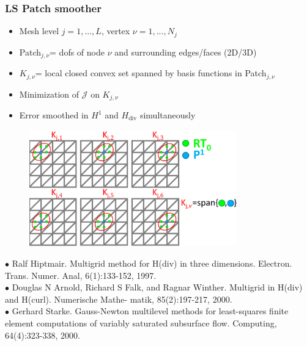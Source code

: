 \documentclass[8pt, oneside]{beamer}   	%
\newcommand{\colo}{\color{orange}}
\newcommand{\titlecolor}[1]{\frametitle{\textcolor{dkgrey}{ \textbf{#1}}}}
\begin{document}

\begin{frame}
\titlecolor{LS Patch smoother}
\begin{itemize}
\item Mesh level $j=1,...,L$, vertex $\nu=1,...,N_j$ 
\item Patch$_{j,\nu}$= dofs of node $\nu$ and surrounding edges/faces (2D/3D)
\item {\colo $K_{j,\nu}$= local closed convex set} spanned by basis functions in Patch$_{j,\nu}$
\item Minimization of $\mathcal{J}$ on $K_{j,\nu}$ 
\item  Error smoothed in $H^1$ and $H_{\text{div}}$ simultaneously
\end{itemize}
\begin{figure}[htbp!]
	\includegraphics[width=0.8\textwidth]{img/patchsmoother.pdf}
		\label{abb_arc}
\end{figure}
\tiny{$\bullet$ Ralf Hiptmair. Multigrid method for H(div) in three dimensions. Electron. Trans. Numer. Anal, 6(1):133-152, 1997.}${}$\\
\tiny{$\bullet$ Douglas N Arnold, Richard S Falk, and Ragnar Winther. Multigrid in H(div) and H(curl). Numerische Mathe-
matik, 85(2):197-217, 2000.}
${}$\\
\tiny{$\bullet$
Gerhard Starke. Gauss-Newton multilevel methods for least-squares finite element computations of variably saturated subsurface flow. Computing, 64(4):323-338, 2000.}

\end{frame}
\end{document}
